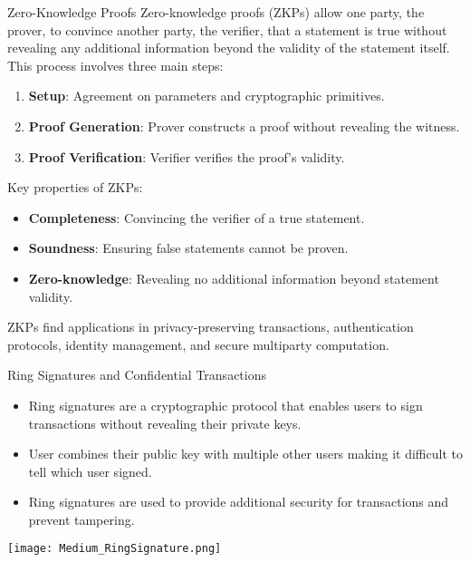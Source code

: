 \begin{frame}{Zero-Knowledge Proofs}
    Zero-knowledge proofs (ZKPs) allow one party, the prover, to convince another party, the verifier, that a statement is true without revealing any additional information beyond the validity of the statement itself. This process involves three main steps:
    
    \begin{enumerate}
        \item \textbf{Setup}: Agreement on parameters and cryptographic primitives.
        \item \textbf{Proof Generation}: Prover constructs a proof without revealing the witness.
        \item \textbf{Proof Verification}: Verifier verifies the proof's validity.
    \end{enumerate}
    
    Key properties of ZKPs:
    
    \begin{itemize}
        \item \textbf{Completeness}: Convincing the verifier of a true statement.
        \item \textbf{Soundness}: Ensuring false statements cannot be proven.
        \item \textbf{Zero-knowledge}: Revealing no additional information beyond statement validity.
    \end{itemize}
    
    ZKPs find applications in privacy-preserving transactions, authentication protocols, identity management, and secure multiparty computation.
\end{frame}

\begin{frame}{Ring Signatures and Confidential Transactions}
    \begin{itemize}
        \item Ring signatures are a cryptographic protocol that enables users to sign transactions without revealing their private keys.
        \item User combines their public key with multiple other users making it difficult to tell which user signed.
        \item Ring signatures are used to provide additional security for transactions and prevent tampering.
    \end{itemize}
    \texttt{[image: Medium\_RingSignature.png]}
\end{frame}

